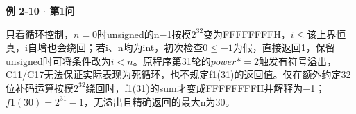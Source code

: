 {\color{ink}\bfseries 例 2-10 \(\cdot \) 第1问}\par\vspace{1bp}只看循环控制，\(n=\allowbreak{}0\)时unsigned的n\(-\)1按模\(2^{32}\)变为FFFFFFFFH，\(i\le \)该上界恒真，i自增也会绕回；若i、n均为int，初次检查\(0\le -1\)为假，直接返回1，保留unsigned时可将条件改为\(i<\allowbreak{}n\)。原程序第31轮的\(power*=\allowbreak{}2\)触发有符号溢出，C11/\allowbreak{}C17无法保证实际表现为死循环，也不规定f1(31)的返回值。仅在额外约定32位补码运算按模\(2^{32}\)绕回时，f1(31)的sum才变成FFFFFFFFH并解释为\(-\)1；\(f1(30)=\allowbreak{}2^{31}-1\)，无溢出且精确返回的最大n为30。
